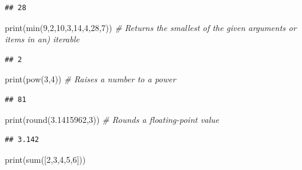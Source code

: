 \documentclass[]{book}
\newenvironment{Shaded}{\begin{snugshade}}{\end{snugshade}}
\newcommand{\DecValTok}[1]{\textcolor[rgb]{0.00,0.00,0.81}{#1}}
\newcommand{\FloatTok}[1]{\textcolor[rgb]{0.00,0.00,0.81}{#1}}
\newcommand{\CommentTok}[1]{\textcolor[rgb]{0.56,0.35,0.01}{\textit{#1}}}
\newcommand{\BuiltInTok}[1]{#1}
\newcommand{\NormalTok}[1]{#1}
\theoremstyle{definition}
\theoremstyle{definition}
\theoremstyle{definition}
\theoremstyle{remark}
\begin{document}
\begin{verbatim}
## 28
\end{verbatim}

\begin{Shaded}
\begin{Highlighting}[]
\BuiltInTok{print}\NormalTok{(}\BuiltInTok{min}\NormalTok{(}\DecValTok{9}\NormalTok{,}\DecValTok{2}\NormalTok{,}\DecValTok{10}\NormalTok{,}\DecValTok{3}\NormalTok{,}\DecValTok{14}\NormalTok{,}\DecValTok{4}\NormalTok{,}\DecValTok{28}\NormalTok{,}\DecValTok{7}\NormalTok{))  }\CommentTok{# Returns the smallest of the given arguments or items in an) iterable}
\end{Highlighting}
\end{Shaded}

\begin{verbatim}
## 2
\end{verbatim}

\begin{Shaded}
\begin{Highlighting}[]
\BuiltInTok{print}\NormalTok{(}\BuiltInTok{pow}\NormalTok{(}\DecValTok{3}\NormalTok{,}\DecValTok{4}\NormalTok{))                   }\CommentTok{# Raises a number to a power}
\end{Highlighting}
\end{Shaded}

\begin{verbatim}
## 81
\end{verbatim}

\begin{Shaded}
\begin{Highlighting}[]
\BuiltInTok{print}\NormalTok{(}\BuiltInTok{round}\NormalTok{(}\FloatTok{3.1415962}\NormalTok{,}\DecValTok{3}\NormalTok{))         }\CommentTok{# Rounds a floating-point value}
\end{Highlighting}
\end{Shaded}

\begin{verbatim}
## 3.142
\end{verbatim}

\begin{Shaded}
\begin{Highlighting}[]
\BuiltInTok{print}\NormalTok{(}\BuiltInTok{sum}\NormalTok{([}\DecValTok{2}\NormalTok{,}\DecValTok{3}\NormalTok{,}\DecValTok{4}\NormalTok{,}\DecValTok{5}\NormalTok{,}\DecValTok{6}\NormalTok{]))       }
\end{Highlighting}
\end{Shaded}
\end{document}
